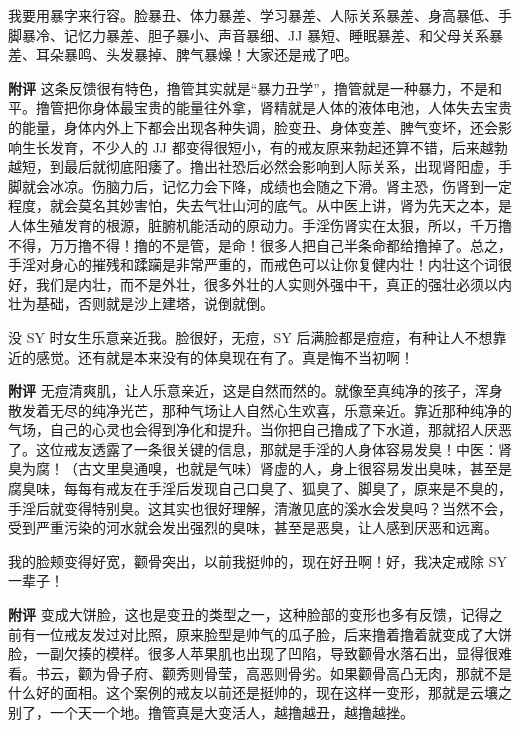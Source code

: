 \begin{case}[变丑]
    我要用暴字来行容。脸暴丑、体力暴差、学习暴差、人际关系暴差、身高暴低、手脚暴冷、记忆力暴差、胆子暴小、声音暴细、JJ 暴短、睡眠暴差、和父母关系暴差、耳朵暴鸣、头发暴掉、脾气暴燥！大家还是戒了吧。

    \textbf{附评} 这条反馈很有特色，撸管其实就是“暴力丑学”，撸管就是一种暴力，不是和平。撸管把你身体最宝贵的能量往外拿，肾精就是人体的液体电池，人体失去宝贵的能量，身体内外上下都会出现各种失调，脸变丑、身体变差、脾气变坏，还会影响生长发育，不少人的 JJ 都变得很短小，有的戒友原来勃起还算不错，后来越勃越短，到最后就彻底阳痿了。撸出社恐后必然会影响到人际关系，出现肾阳虚，手脚就会冰凉。伤脑力后，记忆力会下降，成绩也会随之下滑。肾主恐，伤肾到一定程度，就会莫名其妙害怕，失去气壮山河的底气。从中医上讲，肾为先天之本，是人体生殖发育的根源，脏腑机能活动的原动力。手淫伤肾实在太狠，所以，千万撸不得，万万撸不得！撸的不是管，是命！很多人把自己半条命都给撸掉了。总之，手淫对身心的摧残和蹂躏是非常严重的，而戒色可以让你复健内壮！内壮这个词很好，我们是内壮，而不是外壮，很多外壮的人实则外强中干，真正的强壮必须以内壮为基础，否则就是沙上建塔，说倒就倒。
\end{case}

\begin{case}[变丑]
    没 SY 时女生乐意亲近我。脸很好，无痘，SY 后满脸都是痘痘，有种让人不想靠近的感觉。还有就是本来没有的体臭现在有了。真是悔不当初啊！

    \textbf{附评} 无痘清爽肌，让人乐意亲近，这是自然而然的。就像至真纯净的孩子，浑身散发着无尽的纯净光芒，那种气场让人自然心生欢喜，乐意亲近。靠近那种纯净的气场，自己的心灵也会得到净化和提升。当你把自己撸成了下水道，那就招人厌恶了。这位戒友透露了一条很关键的信息，那就是手淫的人身体容易发臭！中医：肾臭为腐！（古文里臭通嗅，也就是气味）肾虚的人，身上很容易发出臭味，甚至是腐臭味，每每有戒友在手淫后发现自己口臭了、狐臭了、脚臭了，原来是不臭的，手淫后就变得特别臭。这其实也很好理解，清澈见底的溪水会发臭吗？当然不会，受到严重污染的河水就会发出强烈的臭味，甚至是恶臭，让人感到厌恶和远离。
\end{case}

\begin{case}[变丑]
    我的脸颊变得好宽，颧骨突出，以前我挺帅的，现在好丑啊！好，我决定戒除 SY 一辈子！

    \textbf{附评} 变成大饼脸，这也是变丑的类型之一，这种脸部的变形也多有反馈，记得之前有一位戒友发过对比照，原来脸型是帅气的瓜子脸，后来撸着撸着就变成了大饼脸，一副欠揍的模样。很多人苹果肌也出现了凹陷，导致颧骨水落石出，显得很难看。书云，颧为骨子府、颧秀则骨莹，高恶则骨劣。如果颧骨高凸无肉，那就不是什么好的面相。这个案例的戒友以前还是挺帅的，现在这样一变形，那就是云壤之别了，一个天一个地。撸管真是大变活人，越撸越丑，越撸越挫。
\end{case}

